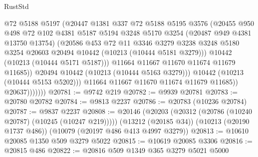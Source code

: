 \begin{lexlean}{RustStd}
\begin{coremodule}
                            @72
                            @5188
                            @5197
                            (@20447
                              @1381
                              @337
                              @72
                              @5188
                              @5195
                              @3576
                              (@20455
                                @950
                                @498
                                @72
                                @102
                                @4381
                                @5187
                                @5194
                                @3248
                                @5170
                                @3254
                                (@20487 @949 @4381 @13750 @13754)
                                (@20586
                                  @453
                                  @72
                                  @11
                                  @3346
                                  @3279
                                  @3238
                                  @3248
                                  @5180
                                  @3254
                                  @20603
                                  @20494
                                  @10442
                                  (@10213 (@10444 @5181 @3279)))
                                @10442
                                (@10213 (@10444 @5171 @5187)))
                              @11664
                              @11667
                              @11670
                              @11674
                              @11679
                              @11685))
                          @20494
                          @10442
                          (@10213 (@10444 @5163 @3279)))
                        @10442
                        (@10213 (@10444 @5153 @5202)))
                      @11664
                      @11667
                      @11670
                      @11674
                      @11679
                      @11685))
                  @20637)))))))
@20781 := @9742 @219
@20782 := @9939 @20781
@20783 := @20780 @20782
@20784 := @9813 @2237
@20786 := @20783 (@10236 @20784)
@20787 := @9837 @2237
@20808 := @20146
    (@20203 (@20312 (@20786 (@10240 @20787) (@10245 (@10247 @219)))))
    (@13212 (@20185 @34))
    (@10213 (@20190 @1737 @486))
    (@10079 (@20197 @486 @413 @4997 @3279))
@20813 := @10610 @20085 @1350 @509 @3279 @5022
@20815 := @10619 @20085 @3306
@20816 := @20815 @486
@20822 := @20816 @509 @1349 @365 @3279 @5021 @5000

\end{coremodule}
\end{lexlean}
